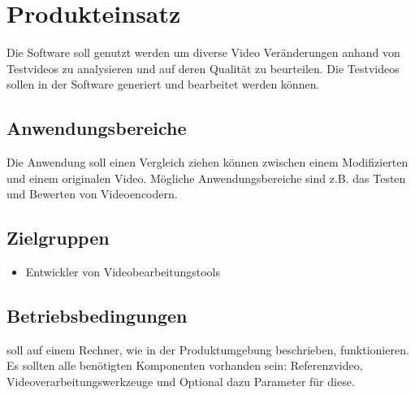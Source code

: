 \chapter{Produkteinsatz}
Die Software soll genutzt werden um diverse Video Veränderungen anhand von Testvideos zu analysieren und auf deren Qualität zu beurteilen. 
Die Testvideos sollen in der Software generiert und bearbeitet werden können.
\section{Anwendungsbereiche}
Die Anwendung soll einen Vergleich ziehen können zwischen einem Modifizierten und einem originalen Video. Mögliche Anwendungsbereiche sind z.B. das Testen und Bewerten von Videoencodern.
\section{Zielgruppen}
\begin{itemize}

\item Entwickler von Videobearbeitungstools

\end{itemize}
\section{Betriebsbedingungen}
\projektTitel soll auf einem Rechner, wie in der Produktumgebung beschrieben, funktionieren.
Es sollten alle benötigten Komponenten vorhanden sein:
Referenzvideo, Videoverarbeitungswerkzeuge und Optional dazu Parameter für diese.